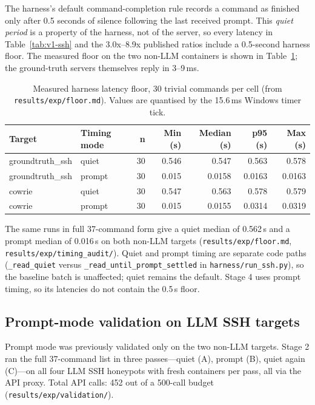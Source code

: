 \documentclass[a4paper,11pt]{article}
\begin{document}
The harness's default command-completion rule records a command as finished
only after 0.5 seconds of silence following the last received prompt. This
\emph{quiet period} is a property of the harness, not of the server, so every
latency in Table~\ref{tab:v1-ssh} and the 3.0x--8.9x published ratios include a
0.5-second harness floor. The measured floor on the two non-LLM containers is
shown in Table~\ref{tab:floor}; the ground-truth servers themselves reply in
3--9\,ms.

\begin{table}[ht]
\centering
\caption{Measured harness latency floor, 30 trivial commands per cell (from
\texttt{results/exp/floor.md}). Values are quantised by the 15.6\,ms Windows
timer tick.}
\label{tab:floor}
\scriptsize
\begin{tabularx}{\textwidth}{l l r r r r r}
\toprule
Target & Timing mode & n & Min (s) & Median (s) & p95 (s) & Max (s) \\
\midrule
groundtruth\_ssh & quiet & 30 & 0.546 & 0.547 & 0.563 & 0.578 \\
groundtruth\_ssh & prompt & 30 & 0.015 & 0.0158 & 0.0163 & 0.0163 \\
cowrie & quiet & 30 & 0.547 & 0.563 & 0.578 & 0.579 \\
cowrie & prompt & 30 & 0.015 & 0.0155 & 0.0314 & 0.0319 \\
\bottomrule
\end{tabularx}
\end{table}

The same runs in full 37-command form give a quiet median of 0.562\,s and a
prompt median of 0.016\,s on both non-LLM targets
(\texttt{results/exp/floor.md}, \texttt{results/exp/timing\_audit/}). Quiet and
prompt timing are separate code paths (\texttt{\_read\_quiet} versus
\texttt{\_read\_until\_\allowbreak{}prompt\_settled} in \texttt{harness/run\_ssh.py}), so the
baseline batch is unaffected; quiet remains the default. Stage 4 uses prompt
timing, so its latencies do not contain the 0.5\,s floor.

\subsection{Prompt-mode validation on LLM SSH targets}
\label{sec:prompt-val}

Prompt mode was previously validated only on the two non-LLM targets. Stage 2
ran the full 37-command list in three passes---quiet (A), prompt (B), quiet
again (C)---on all four LLM SSH honeypots with fresh containers per pass, all
via the API proxy. Total API calls: 452 out of a 500-call budget
(\texttt{results/exp/validation/}).
\end{document}
